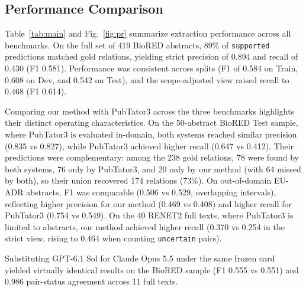\documentclass[preprint,10pt,letterpaper]{elsarticle}
\newcommand{\st}[1]{\texttt{#1}}             %
\begin{document}
\subsection{Performance Comparison}
Table~\ref{tab:main} and Fig.~\ref{fig:pr} summarize extraction performance across all benchmarks. On the full set of 419 BioRED abstracts, 89\% of \st{supported} predictions matched gold relations, yielding strict precision of 0.894 and recall of 0.430 (F1 0.581). Performance was consistent across splits (F1 of 0.584 on Train, 0.608 on Dev, and 0.542 on Test), and the scope-adjusted view raised recall to 0.468 (F1 0.614).

Comparing our method with PubTator3 across the three benchmarks highlights their distinct operating characteristics. On the 50-abstract BioRED Test sample, where PubTator3 is evaluated in-domain, both systems reached similar precision (0.835 vs 0.827), while PubTator3 achieved higher recall (0.647 vs 0.412). Their predictions were complementary: among the 238 gold relations, 78 were found by both systems, 76 only by PubTator3, and 20 only by our method (with 64 missed by both), so their union recovered 174 relations (73\%). On out-of-domain EU-ADR abstracts, F1 was comparable (0.506 vs 0.529, overlapping intervals), reflecting higher precision for our method (0.469 vs 0.408) and higher recall for PubTator3 (0.754 vs 0.549). On the 40 RENET2 full texts, where PubTator3 is limited to abstracts, our method achieved higher recall (0.370 vs 0.254 in the strict view, rising to 0.464 when counting \st{uncertain} pairs).

Substituting GPT-6.1 Sol for Claude Opus 5.5 under the same frozen card yielded virtually identical results on the BioRED sample (F1 0.555 vs 0.551) and 0.986 pair-status agreement across 11 full texts.
\end{document}
